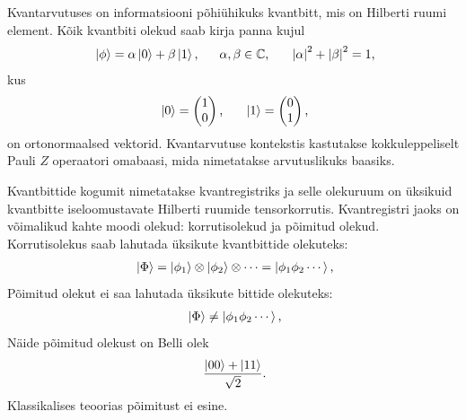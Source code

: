 \documentclass[12pt]{report}
\def\abs#1{\left|#1\right|}
\def\ket#1{\left|#1\right>}
\begin{document}
Kvantarvutuses on informatsiooni põhiühikuks kvantbitt, mis on Hilberti ruumi element.
Kõik kvantbiti olekud saab kirja panna kujul
\begin{align}
    \ket{\phi} = \alpha \ket{0} + \beta \ket{1} \rlap{,}
    \qquad \alpha, \beta \in \mathbb{C} \rlap{,}
    \qquad \abs{\alpha}^2 + \abs{\beta}^2 = 1 \rlap{,}
\end{align}
kus
\begin{align}\label{eq:compbasis}
    \ket{0} = \begin{pmatrix}
        1 \\
        0 \\
    \end{pmatrix} \rlap{,}
    \qquad
    \ket{1} = \begin{pmatrix}
        0 \\
        1 \\
    \end{pmatrix} \rlap{,}
\end{align}
on ortonormaalsed vektorid.
Kvantarvutuse kontekstis kastutakse kokkuleppeliselt Pauli \(Z\) operaatori omabaasi, mida nimetatakse arvutuslikuks baasiks.

Kvantbittide kogumit nimetatakse kvantregistriks ja selle olekuruum on üksikuid kvantbitte iseloomustavate Hilberti ruumide tensorkorrutis.
Kvantregistri jaoks on võimalikud kahte moodi olekud: korrutisolekud ja põimitud olekud.
Korrutisolekus saab lahutada üksikute kvantbittide olekuteks:
\begin{align}
    \ket{\Phi}
    = \ket{\phi_1} \otimes \ket{\phi_2} \otimes \cdots
    = \ket{\phi_1 \phi_2 \cdots} \rlap{,}
\end{align}
Põimitud olekut ei saa lahutada üksikute bittide olekuteks:
\begin{align}
    \ket{\Phi}
    \ne \ket{\phi_1 \phi_2 \cdots} \rlap{,}
\end{align}
Näide põimitud olekust on Belli olek
\begin{align}
    \frac{\ket{00} + \ket{11}}{\sqrt 2} \rlap{.}
\end{align}
Klassikalises teoorias põimitust ei esine.
\end{document}
